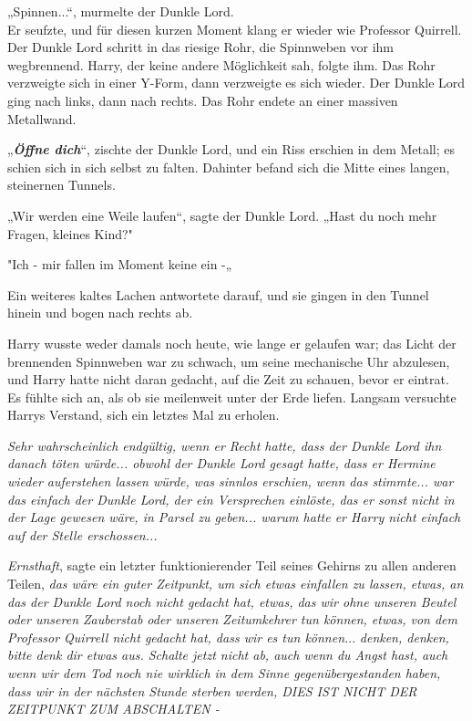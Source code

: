 {„Spinnen...“, murmelte der Dunkle Lord.\\ Er seufzte, und für diesen kurzen Moment klang er wieder wie Professor Quirrell. Der Dunkle Lord schritt in das riesige Rohr, die Spinnweben vor ihm wegbrennend. Harry, der keine andere Möglichkeit sah, folgte ihm. Das Rohr verzweigte sich in einer Y-Form, dann verzweigte es sich wieder. Der Dunkle Lord ging nach links, dann nach rechts. Das Rohr endete an einer massiven Metallwand.

„\textbf{\emph{Öffne dich}}“, zischte der Dunkle Lord, und ein Riss erschien in dem Metall; es schien sich in sich selbst zu falten. Dahinter befand sich die Mitte eines langen, steinernen Tunnels.

„Wir werden eine Weile laufen“, sagte der Dunkle Lord. „Hast du noch mehr Fragen, kleines Kind?"

"Ich - mir fallen im Moment keine ein -„

Ein weiteres kaltes Lachen antwortete darauf, und sie gingen in den Tunnel hinein und bogen nach rechts ab.

Harry wusste weder damals noch heute, wie lange er gelaufen war; das Licht der brennenden Spinnweben war zu schwach, um seine mechanische Uhr abzulesen, und Harry hatte nicht daran gedacht, auf die Zeit zu schauen, bevor er eintrat. Es fühlte sich an, als ob sie meilenweit unter der Erde liefen. Langsam versuchte Harrys Verstand, sich ein letztes Mal zu erholen.

\emph{Sehr wahrscheinlich endgültig, wenn er Recht hatte, dass der Dunkle Lord ihn danach töten würde... obwohl der Dunkle Lord gesagt hatte, dass er Hermine wieder auferstehen lassen würde, was sinnlos erschien, wenn das stimmte... war das einfach der Dunkle Lord, der ein Versprechen einlöste, das er sonst nicht in der Lage gewesen wäre, in Parsel zu geben... warum hatte er Harry nicht einfach auf der Stelle erschossen...}

\emph{Ernsthaft}, sagte ein letzter funktionierender Teil seines Gehirns zu allen anderen Teilen, \emph{das wäre ein guter Zeitpunkt, um sich etwas einfallen zu lassen, etwas, an das der Dunkle Lord noch nicht gedacht hat, etwas, das wir ohne unseren Beutel oder unseren Zauberstab oder unseren Zeitumkehrer tun können, etwas, von dem Professor Quirrell nicht gedacht hat, dass wir es tun können.}.. \emph{denken, denken, bitte denk dir etwas aus. Schalte jetzt nicht ab, auch wenn du Angst hast, auch wenn wir dem Tod noch nie wirklich in dem Sinne gegenübergestanden haben, dass wir in der nächsten Stunde sterben werden, DIES IST NICHT DER ZEITPUNKT ZUM ABSCHALTEN -}

}

